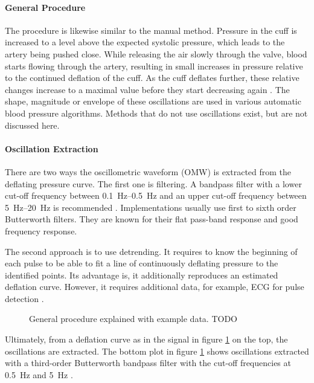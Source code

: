 \paragraph{General Procedure} The procedure is likewise similar to the manual method. Pressure in the cuff is increased to a level above the expected systolic pressure, which leads to the artery being pushed close. While releasing the air slowly through the valve, blood starts flowing through the artery, resulting in small increases in pressure relative to the continued deflation of the cuff. As the cuff deflates further, these relative changes increase to a maximal value before they start decreasing again \citep{Forouzanfar2015, Drzewiecki1994, Ursino1996}. The shape, magnitude or envelope of these oscillations are used in various automatic blood pressure algorithms. Methods that do not use oscillations exist, but are not discussed here. 


\paragraph{Oscillation Extraction} There are two ways the oscillometric waveform (OMW) is extracted from the deflating pressure curve. The first one is filtering. A bandpass filter with a lower cut-off frequency between \SIrange{0.1}{0.5}{\Hz} and an upper cut-off frequency between \SIrange{5}{20}{\Hz} is recommended \citep{Forouzanfar2015}. Implementations usually use first \citep{Lim2015} to sixth order \citep{Jazbinsek2010} Butterworth filters. They are known for their flat pass-band response and good frequency response. 

The second approach is to use detrending. It requires to know the beginning of each pulse to be able to fit a line of continuously deflating pressure to the identified points. Its advantage is, it additionally reproduces an estimated deflation curve. However, it requires additional data, for example, ECG for pulse detection \citep{Forouzanfar2015}.

\begin{figure}[h]
\centering
\caption{General procedure explained with example data. TODO}
\label{fig:osc}
\end{figure}


Ultimately, from a deflation curve as in the signal in figure \ref{fig:osc} on the top, the oscillations are extracted. The bottom plot in figure \ref{fig:osc} shows oscillations extracted with a third-order Butterworth bandpass filter with the cut-off frequencies at \SI{0.5}{\Hz} and \SI{5}{\Hz} \citep{Babbs2012}.


